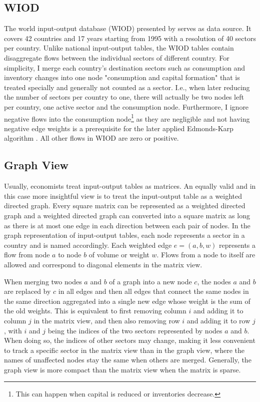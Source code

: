 \documentclass{paper}
\begin{document}
\subsection{WIOD}
The world input-output database (WIOD) presented by \cite{timmer2012world} serves as data source. It covers 42 countries and 17 years starting from 1995 with a resolution of 40 sectors per country. Unlike national input-output tables, the WIOD tables contain disaggregate flows between the individual sectors of different country. For simplicity, I merge each country's destination sectors such as consumption and inventory changes into one node "consumption and capital formation" that is treated specially and generally not counted as a sector. I.e., when later reducing the number of sectors per country to one, there will actually be two nodes left per country, one active sector and the consumption node. Furthermore, I ignore negative flows into the consumption node\footnote{This can happen when capital is reduced or inventories decrease.} as they are negligible and not having negative edge weights is a prerequisite for the later applied Edmonds-Karp algorithm \cite{edmonds1972theoretical}. All other flows in WIOD are zero or positive.

\subsection{Graph View}
\label{sec:graphview}
Usually, economists treat input-output tables as matrices. An equally valid and in this case more insightful view is to treat the input-output table as a weighted directed graph. Every square matrix can be represented as a weighted directed graph and a weighted directed graph can converted into a square matrix as long as there is at most one edge in each direction between each pair of nodes. In the graph representation of input-output tables, each node represents a sector in a country and is named accordingly. Each weighted edge $e=(a, b, w)$ represents a flow from node $a$ to node $b$ of volume or weight $w$. Flows from a node to itself are allowed and correspond to diagonal elements in the matrix view.

When merging two nodes $a$ and $b$ of a graph into a new node $c$, the nodes $a$ and $b$ are replaced by $c$ in all edges and then all edges that connect the same nodes in the same direction aggregated into a single new edge whose weight is the sum of the old weights. This is equivalent to first removing column $i$ and adding it to column $j$ in the matrix view, and then also removing row $i$ and adding it to row $j$, with $i$ and $j$ being the indices of the two sectors represented by nodes $a$ and $b$. When doing so, the indices of other sectors may change, making it less convenient to track a specific sector in the matrix view than in the graph view, where the names of unaffected nodes stay the same when others are merged. Generally, the graph view is more compact than the matrix view when the matrix is sparse.
\end{document}
